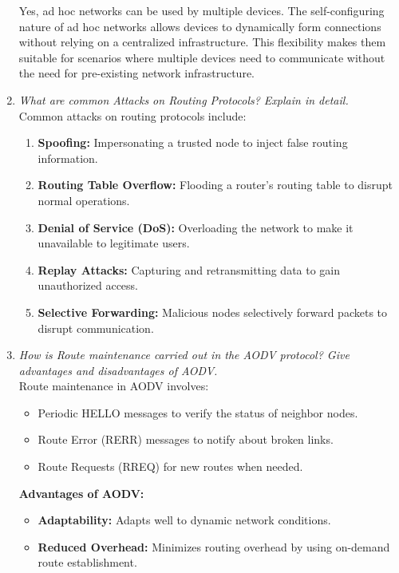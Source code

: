 \documentclass[11pt]{article}
\begin{document}
\begin{enumerate}
          Yes, ad hoc networks can be used by multiple devices. The self-configuring nature of ad hoc networks allows devices to dynamically form connections without relying on a centralized infrastructure. This flexibility makes them suitable for scenarios where multiple devices need to communicate without the need for pre-existing network infrastructure.

    \item \textit{What are common Attacks on Routing Protocols? Explain in detail.}\\

          Common attacks on routing protocols include:
          \begin{enumerate}
              \item \textbf{Spoofing:} Impersonating a trusted node to inject false routing information.
              \item \textbf{Routing Table Overflow:} Flooding a router's routing table to disrupt normal operations.
              \item \textbf{Denial of Service (DoS):} Overloading the network to make it unavailable to legitimate users.
              \item \textbf{Replay Attacks:} Capturing and retransmitting data to gain unauthorized access.
              \item \textbf{Selective Forwarding:} Malicious nodes selectively forward packets to disrupt communication.
          \end{enumerate}

    \item \textit{How is Route maintenance carried out in the AODV protocol? Give advantages and disadvantages of AODV.}\\

          Route maintenance in AODV involves:
          \begin{itemize}
              \item Periodic HELLO messages to verify the status of neighbor nodes.
              \item Route Error (RERR) messages to notify about broken links.
              \item Route Requests (RREQ) for new routes when needed.
          \end{itemize}

          \textbf{Advantages of AODV:}
          \begin{itemize}
              \item \textbf{Adaptability:} Adapts well to dynamic network conditions.
              \item \textbf{Reduced Overhead:} Minimizes routing overhead by using on-demand route establishment.
          \end{itemize}


\end{enumerate}
\end{document}
